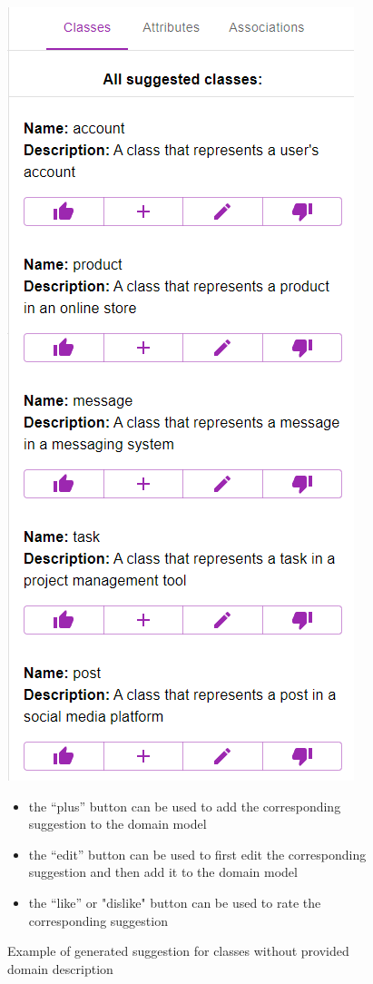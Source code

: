 \begin{figure}[!h]
    \includegraphics[scale=0.45]{../docs/images/frontend/suggested-classes.png} \\
    \begin{itemize}
    \item the ``plus'' button can be used to add the corresponding suggestion to the domain model
    \item the ``edit'' button can be used to first edit the corresponding suggestion and then add it to the domain model
    \item the ``like'' or "dislike" button can be used to rate the corresponding suggestion
    \end{itemize}
    \caption{\centering Example of generated suggestion for classes without provided domain description}
    \label{fig:suggested_classes}
\end{figure}

